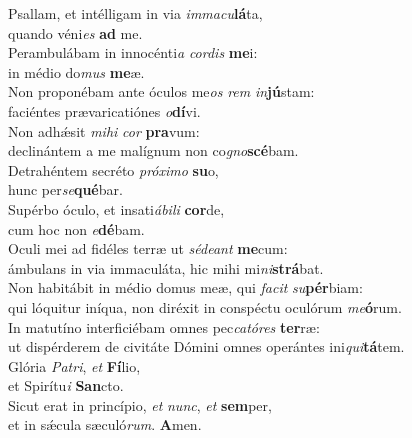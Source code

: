 \evenverse Psallam, et intélligam in via \textit{im}\textit{ma}\textit{cu}\textbf{lá}ta,~\*\\
\evenverse quando véni\textit{es} \textbf{ad} me.\\
\oddverse Perambulábam in innocénti\textit{a} \textit{cor}\textit{dis} \textbf{me}i:~\*\\
\oddverse in médio do\textit{mus} \textbf{me}æ.\\
\evenverse Non proponébam ante óculos me\textit{os} \textit{rem} \textit{in}\textbf{jú}stam:~\*\\
\evenverse faciéntes prævaricatiónes \textit{o}\textbf{dí}vi.\\
\oddverse Non adhǽsit \textit{mi}\textit{hi} \textit{cor} \textbf{pra}vum:~\*\\
\oddverse declinántem a me malígnum non co\textit{gno}\textbf{scé}bam.\\
\evenverse Detrahéntem secréto \textit{pró}\textit{xi}\textit{mo} \textbf{su}o,~\*\\
\evenverse hunc per\textit{se}\textbf{qué}bar.\\
\oddverse Supérbo óculo, et insati\textit{á}\textit{bi}\textit{li} \textbf{cor}de,~\*\\
\oddverse cum hoc non \textit{e}\textbf{dé}bam.\\
\evenverse Oculi mei ad fidéles terræ ut \textit{sé}\textit{de}\textit{ant} \textbf{me}cum:~\*\\
\evenverse ámbulans in via immaculáta, hic mihi mi\textit{ni}\textbf{strá}bat.\\
\oddverse Non habitábit in médio domus meæ, qui \textit{fa}\textit{cit} \textit{su}\textbf{pér}biam:~\*\\
\oddverse qui lóquitur iníqua, non diréxit in conspéctu oculórum \textit{me}\textbf{ó}rum.\\
\evenverse In matutíno interficiébam omnes pec\textit{ca}\textit{tó}\textit{res} \textbf{ter}ræ:~\*\\
\evenverse ut dispérderem de civitáte Dómini omnes operántes ini\textit{qui}\textbf{tá}tem.\\
\oddverse Glória \textit{Pa}\textit{tri}, \textit{et} \textbf{Fí}lio,~\*\\
\oddverse et Spirítu\textit{i} \textbf{San}cto.\\
\evenverse Sicut erat in princípio, \textit{et} \textit{nunc}, \textit{et} \textbf{sem}per,~\*\\
\evenverse et in sǽcula sæculó\textit{rum}. \textbf{A}men.\\
